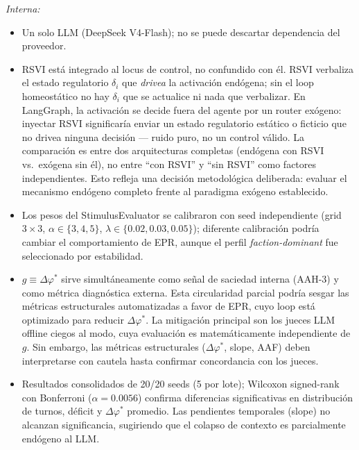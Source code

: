 \documentclass{llncs}
\begin{document}
\textit{Interna:}
\begin{itemize}[nosep,leftmargin=*]
\item Un solo LLM (DeepSeek V4-Flash); no se puede descartar
      dependencia del proveedor.
\item RSVI est\'a integrado al locus de control, no confundido con \'el.
      RSVI verbaliza el estado regulatorio $\delta_i$ que \emph{drivea} la
      activaci\'on end\'ogena; sin el loop homeost\'atico no hay $\delta_i$
      que se actualice ni nada que verbalizar. En LangGraph, la activaci\'on
      se decide fuera del agente por un router ex\'ogeno: inyectar RSVI
      significar\'ia enviar un estado regulatorio est\'atico o ficticio que
      no drivea ninguna decisi\'on --- ruido puro, no un control v\'alido.
      La comparaci\'on es entre dos arquitecturas completas (end\'ogena con
      RSVI vs.\ ex\'ogena sin \'el), no entre ``con RSVI'' y ``sin RSVI''
      como factores independientes. Esto refleja una decisi\'on
      metodol\'ogica deliberada: evaluar el mecanismo end\'ogeno completo
      frente al paradigma ex\'ogeno establecido.
\item Los pesos del StimulusEvaluator se calibraron con seed independiente
      (grid $3{\times}3$, $\alpha\in\{3,4,5\}$, $\lambda\in\{0.02,0.03,0.05\}$);
      diferente calibraci\'on podr\'ia cambiar el comportamiento de EPR, aunque
      el perfil \emph{faction-dominant} fue seleccionado por estabilidad.
\item $g \equiv \Delta\varphi^*$ sirve simult\'aneamente como se\~nal de
      saciedad interna (AAH-3) y como m\'etrica diagn\'ostica externa.
      Esta circularidad parcial podr\'ia sesgar las m\'etricas
      estructurales automatizadas a favor de EPR, cuyo loop est\'a
      optimizado para reducir $\Delta\varphi^*$. La mitigaci\'on principal
      son los jueces LLM offline ciegos al modo, cuya evaluaci\'on es
      matem\'aticamente independiente de $g$. Sin embargo, las
      m\'etricas estructurales ($\Delta\varphi^*$, slope, AAF) deben
      interpretarse con cautela hasta confirmar concordancia con los
      jueces.
\item Resultados consolidados de 20/20 seeds (5 por lote);
      Wilcoxon signed-rank con Bonferroni ($\alpha{=}0.0056$) confirma
      diferencias significativas en distribuci\'on de turnos, d\'eficit
      y $\Delta\varphi^*$ promedio. Las pendientes temporales (slope)
      no alcanzan significancia, sugiriendo que el colapso de contexto
      es parcialmente end\'ogeno al LLM.
\end{itemize}
\end{document}
